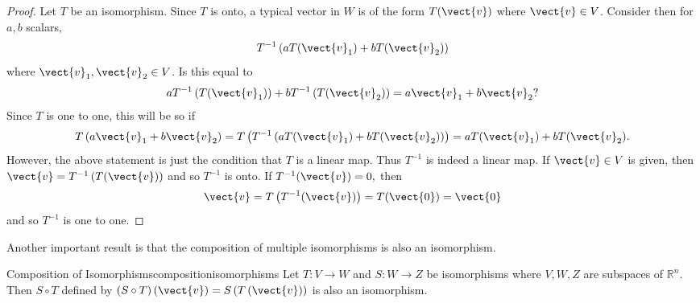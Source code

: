 \begin{proof} Let $T$ be an isomorphism.  Since $T$ is onto, a typical
vector in $W$ is of the form $T(\vect{v})$ where $\vect{v} \in V$. Consider then for $a,b$
scalars, 
\begin{equation*}
T^{-1}\left( aT(\vect{v}_{1})+bT(\vect{v}_{2})\right)
\end{equation*}
where $\vect{v}_{1}, \vect{v}_2 \in V$. Is this equal to 
\begin{equation*}
aT^{-1}\left( T (\vect{v}_{1})\right) +bT^{-1}\left( T(\vect{v}_{2})\right) =a\vect{v}_{1}+b\vect{v}_{2}?
\end{equation*}
Since $T$ is one to one, this will be so if 
\begin{equation*}
T\left( a\vect{v}_{1}+b\vect{v}_{2}\right) =T\left( T^{-1}\left( aT(\vect{v}_{1})+bT(\vect{v}_{2})\right)
\right) =aT(\vect{v}_{1})+bT(\vect{v}_{2}).
\end{equation*}
However, the above statement is just the condition that $T$ is a linear map.
Thus $T^{-1}$ is indeed a linear map. If $\vect{v} \in V$ is given, then $\vect{v}=T^{-1}\left( T(\vect{v})\right) $ and so $T^{-1}$ is onto. If $T^{-1} (\vect{v})=0,$ then 
\begin{equation*}
\vect{v}=T\left( T^{-1}(\vect{v})\right) =T(\vect{0})=\vect{0}
\end{equation*}
and so $T^{-1}$ is one to one.
\end{proof}

Another important result is that the composition of multiple isomorphisms is also an isomorphism.

\begin{proposition}{Composition of Isomorphisms}{compositionisomorphisms}
Let $T:V\rightarrow W$ and  $S:W\rightarrow Z$ be isomorphisms where $V,W,Z$ are subspaces of $\mathbb{R}^n$. Then $S\circ
T $ defined by $\left( S\circ T\right) \left( \vect{v} \right) = S\left(
T\left( \vect{v} \right) \right) $ is also an isomorphism.
\end{proposition}

